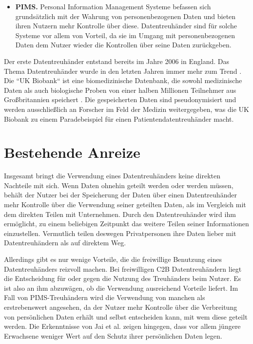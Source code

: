 \documentclass{scrreprt}
\begin{document}
\begin{itemize}
    \item \textbf{PIMS.} Personal Information Management Systeme befassen sich grundsätzlich mit der Wahrung von personenbezogenen Daten und bieten ihren Nutzern mehr Kontrolle über diese.  Datentreuhänder sind für solche Systeme vor allem von Vorteil, da sie im Umgang mit personenbezogenen Daten dem Nutzer wieder die Kontrollen über seine Daten zurückgeben.
\end{itemize}

Der erste Datentreuhänder entstand bereits im Jahre 2006 in England. Das Thema Datentreuhänder wurde in den letzten Jahren immer mehr zum Trend \cite{dt-richter2020ddvtalk}. Die ``UK Biobank`` ist eine biomedizinische Datenbank, die sowohl medizinische Daten als auch biologische Proben von einer halben Millionen Teilnehmer aus Großbritannien speichert \cite{dt-hardinges2018data}. Die gespeicherten Daten sind pseudonymisiert und werden ausschließlich an Forscher im Feld der Medizin weitergegeben, was die UK Biobank zu einem Paradebeispiel für einen Patientendatentreuhänder macht.


\section{Bestehende Anreize}
Insgesamt bringt die Verwendung eines Datentreuhänders keine direkten Nachteile mit sich. Wenn Daten ohnehin geteilt werden oder werden müssen, behält der Nutzer bei der Speicherung der Daten über einen Datentreuhänder mehr Kontrolle über die Verwendung seiner geteilten Daten, als im Vergleich mit dem direkten Teilen mit Unternehmen. Durch den Datentreuhänder wird ihm ermöglicht, zu einem beliebigen Zeitpunkt das weitere Teilen seiner Informationen einzustellen. Vermutlich teilen deswegen Privatpersonen ihre Daten lieber mit Datentreuhändern als auf direktem Weg. \cite{dt-tresor24study}

Allerdings gibt es nur wenige Vorteile, die die freiwillige Benutzung eines Datentreuhänders reizvoll machen. Bei freiwilligen C2B Datentreuhändern liegt die Entscheidung für oder gegen die Nutzung des Treuhänders beim Nutzer. Es ist also an ihm abzuwägen, ob die Verwendung ausreichend Vorteile liefert. Im Fall von PIMS-Treuhändern wird die Verwendung von manchen als erstrebenswert angesehen, da der Nutzer mehr Kontrolle über die Verbreitung von persönlichen Daten erhält und selbst entscheiden kann, mit wem diese geteilt werden. Die Erkenntnisse von Jai et al. \cite{dt-jai2016privacy} zeigen hingegen, dass vor allem jüngere Erwachsene weniger Wert auf den Schutz ihrer persönlichen Daten legen.
\end{document}
